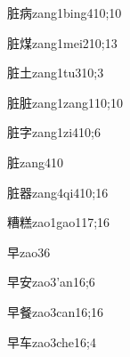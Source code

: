 \begin{verbete}{脏病}{zang1bing4}{10;10}
\end{verbete}

\begin{verbete}{脏煤}{zang1mei2}{10;13}
\end{verbete}

\begin{verbete}{脏土}{zang1tu3}{10;3}
\end{verbete}

\begin{verbete}{脏脏}{zang1zang1}{10;10}
\end{verbete}

\begin{verbete}{脏字}{zang1zi4}{10;6}
\end{verbete}

\begin{verbete}{脏}{zang4}{10}
\end{verbete}

\begin{verbete}{脏器}{zang4qi4}{10;16}
\end{verbete}

\begin{verbete}{糟糕}{zao1gao1}{17;16}
\end{verbete}

\begin{verbete}{早}{zao3}{6}
\end{verbete}

\begin{verbete}{早安}{zao3'an1}{6;6}
\end{verbete}

\begin{verbete}{早餐}{zao3can1}{6;16}
\end{verbete}

\begin{verbete}{早车}{zao3che1}{6;4}
\end{verbete}

